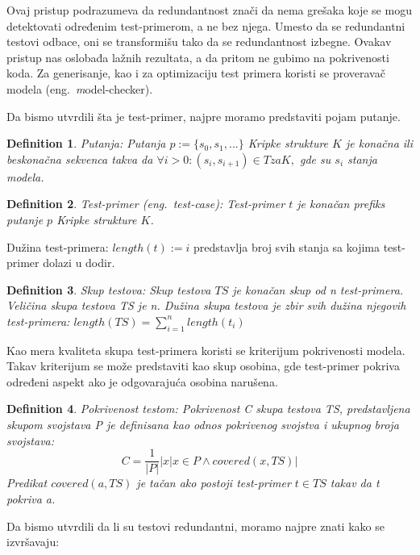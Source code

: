 \documentclass[a4paper]{article}
\newtheorem{definition}{Definition}[section]
\begin{document}
Ovaj pristup\cite{prvinacin} podrazumeva da redundantnost znači da nema grešaka koje se mogu detektovati određenim test-primerom, a ne bez njega. Umesto da se redundantni testovi odbace, oni se transformišu tako da se redundantnost izbegne. Ovakav pristup nas oslobađa lažnih rezultata, a da pritom ne gubimo na pokrivenosti koda. Za generisanje, kao i za optimizaciju test primera koristi se proveravač modela (eng.~{\textit model-checker}).

Da bismo utvrdili šta je test-primer, najpre moramo predstaviti pojam putanje.

\begin{definition}{Putanja:}
Putanja $ p := \{s_0, s_1, ...\}$ Kripke strukture $K$ je konačna ili beskonačna sekvenca takva da $ \forall i > 0 : (s_i, s_{i+1}) \in T za K, $ gde su $ s_i $ stanja modela.
\end{definition}

\begin{definition}{Test-primer (eng.~{\textit test-case}):}
Test-primer $t$ je konačan prefiks putanje $p$ Kripke strukture $K$.
\end{definition}

Dužina test-primera: $ length(t) := i$ predstavlja broj svih stanja sa kojima test-primer dolazi u dodir.

\begin{definition}{Skup testova:}
Skup testova $TS$ je konačan skup od n test-primera. Veličina skupa testova TS je n. Dužina skupa testova je zbir svih dužina njegovih test-primera: $
    length(TS) = \sum_{i=1}^{n}length(t_i)$
\end{definition}

Kao mera kvaliteta skupa test-primera koristi se kriterijum pokrivenosti modela. Takav kriterijum se može predstaviti kao skup osobina, gde test-primer pokriva određeni aspekt ako je odgovarajuća osobina narušena.

\begin{definition}{Pokrivenost testom:}
Pokrivenost C skupa testova TS, predstavljena skupom svojstava P je definisana kao odnos pokrivenog svojstva i ukupnog broja svojstava:
\begin{equation}
    C = \frac{1}{|P|}|{x|x \in P \land covered(x,TS)}|
\end{equation}
Predikat $ covered(a, TS)$ je tačan ako postoji test-primer $ t \in TS$ takav da \textit{t} pokriva \textit{a}.
\end{definition}

Da bismo utvrdili da li su testovi redundantni, moramo najpre znati kako se izvršavaju:
\end{document}
